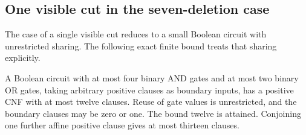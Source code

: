 \subsection{One visible cut in the seven-deletion case}
The case of a single visible cut reduces to a small Boolean circuit with unrestricted sharing. The following exact finite bound treats that sharing explicitly.

\begin{lemma}\label{lem:fourandtwoor}
A Boolean circuit with at most four binary AND gates and at most two binary OR gates, taking arbitrary positive clauses as boundary inputs, has a positive CNF with at most twelve clauses. Reuse of gate values is unrestricted, and the boundary clauses may be zero or one. The bound twelve is attained. Conjoining one further affine positive clause gives at most thirteen clauses.
\end{lemma}
